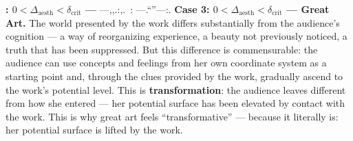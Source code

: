 \documentclass[12pt,a4paper]{article}
\theoremstyle{remark}
\newcommand{\AesthDelta}{\Delta_{\text{aesth}}}
\newcommand{\CritDelta}{\delta_{\text{crit}}}
\begin{document}
\noindent\textbf{: $0 < \AesthDelta < \CritDelta$ ---}
---,,.:,.\ : ---.``''---:.
\textbf{Case 3: $0 < \AesthDelta < \CritDelta$ --- Great Art.}
The world presented by the work differs substantially from the audience's cognition --- a way of reorganizing experience, a beauty not previously noticed, a truth that has been suppressed. But this difference is commensurable: the audience can use concepts and feelings from her own coordinate system as a starting point and, through the clues provided by the work, gradually ascend to the work's potential level. This is \textbf{transformation}: the audience leaves different from how she entered --- her potential surface has been elevated by contact with the work. This is why great art feels ``transformative'' --- because it literally is: her potential surface is lifted by the work.
\subsection{}
\end{document}
